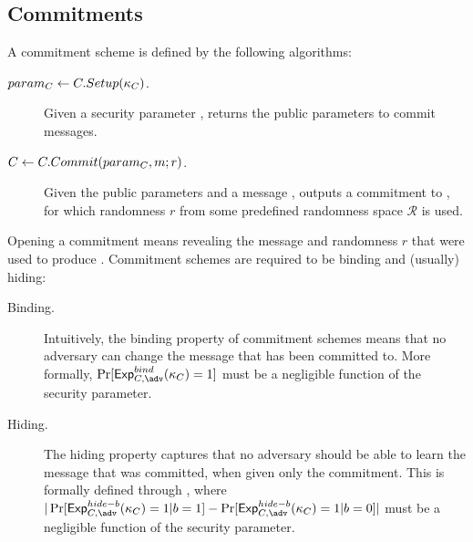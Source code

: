 \subsection{Commitments}
\label{sapp:commitments}

A commitment scheme is defined by the following algorithms:

\begin{description}
\item[$param_C \gets C.Setup(\kappa_{C})$.] Given a security parameter \Csecpar,
  returns the public parameters \Cparm to commit messages.
\item[$C \gets C.Commit(param_C,m;r)$.] Given the public parameters and
  a message \msg, outputs a commitment \Ccom to \msg, for which randomness $r$
  from some predefined randomness space $\mathcal{R}$ is used.
\end{description}

Opening a commitment \Ccom means revealing the message \msg and randomness $r$
that were used to produce \Ccom. Commitment schemes are required to be binding
and (usually) hiding:

\begin{description}
\item[Binding.] Intuitively, the binding property of commitment schemes means
  that no adversary can change the message that has been committed to. More
  formally, $\Pr[\ExpComBind(\Csecpar) = 1]$ must be a negligible function of
  the security parameter.
\item[Hiding.] The hiding property captures that no adversary should be able to
  learn the message that was committed, when given only the commitment. This is
  formally defined through \ExpComHideb, where $|\Pr[\ExpComHideb(\Csecpar)=1|
  b=1] - \Pr[\ExpComHideb(\Csecpar)=1|b=0]|$ must be a negligible function of
  the security parameter.
\end{description}

